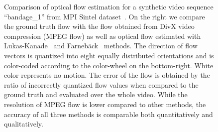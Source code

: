 \documentclass[10pt,twocolumn,letterpaper]{article}
\begin{document}
\begin{figure}[t!]
\begin{center}
\begin{tabular}{p{}p{}p{}}
\end{tabular}
\caption{Comparison of optical flow estimation for a synthetic video sequence ``bandage\_1'' from MPI Sintel dataset~\cite{Butler12}. On the right we compare the ground truth flow with the flow obtained from DivX video compression (MPEG flow) as well as optical flow estimated with Lukas-Kanade~\cite{Lucas81} and Farneb\"ack~\cite{Farneback03} methods. The direction of flow vectors is quantized into eight equally distributed orientations and is color-coded according to the color-wheel on the bottom-right. White color represents no motion. The error of the flow is obtained by the ratio of incorrectly quantized flow values when compared to the ground truth and evaluated over the whole video. While the resolution of MPEG flow is lower compared to other methods, the accuracy of all three methods is comparable both quantitatively and qualitatively.
}
\label{fig:flow1}
\end{center}
\end{figure}
\end{document}

